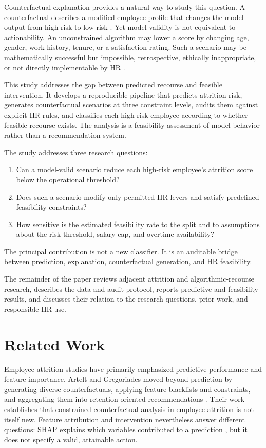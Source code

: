 \documentclass[11pt]{article}
\begin{document}
Counterfactual explanation provides a natural way to study this question. A counterfactual describes a modified employee profile that changes the model output from high-risk to low-risk \cite{mothilal2020,karimi2022}. Yet model validity is not equivalent to actionability. An unconstrained algorithm may lower a score by changing age, gender, work history, tenure, or a satisfaction rating. Such a scenario may be mathematically successful but impossible, retrospective, ethically inappropriate, or not directly implementable by HR \cite{ustun2019,poyiadzi2020}.

This study addresses the gap between predicted recourse and feasible intervention. It develops a reproducible pipeline that predicts attrition risk, generates counterfactual scenarios at three constraint levels, audits them against explicit HR rules, and classifies each high-risk employee according to whether feasible recourse exists. The analysis is a feasibility assessment of model behavior rather than a recommendation system.

The study addresses three research questions:
\begin{enumerate}[label=\textbf{RQ\arabic*:}]
  \item Can a model-valid scenario reduce each high-risk employee's attrition score below the operational threshold?
  \item Does such a scenario modify only permitted HR levers and satisfy predefined feasibility constraints?
  \item How sensitive is the estimated feasibility rate to the split and to assumptions about the risk threshold, salary cap, and overtime availability?
\end{enumerate}
The principal contribution is not a new classifier. It is an auditable bridge between prediction, explanation, counterfactual generation, and HR feasibility.

The remainder of the paper reviews adjacent attrition and algorithmic-recourse research, describes the data and audit protocol, reports predictive and feasibility results, and discusses their relation to the research questions, prior work, and responsible HR use.

\section{Related Work}
Employee-attrition studies have primarily emphasized predictive performance and feature importance. Artelt and Gregoriades moved beyond prediction by generating diverse counterfactuals, applying feature blacklists and constraints, and aggregating them into retention-oriented recommendations \cite{artelt2023}. Their work establishes that constrained counterfactual analysis in employee attrition is not itself new. Feature attribution and intervention nevertheless answer different questions: SHAP explains which variables contributed to a prediction \cite{lundberg2017}, but it does not specify a valid, attainable action.
\end{document}
